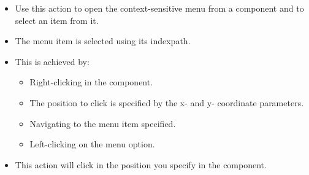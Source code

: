 
\begin{itemize}
\item Use this action to open the context-sensitive menu from a component and to select an item from it.
\item The menu item is selected using its indexpath. 
\item This is achieved by:
\begin{itemize}
\item Right-clicking in the component.
\item The position to click is specified by the x- and y- coordinate parameters.
\item Navigating to the menu item specified.
\item Left-clicking on the menu option.  
\end{itemize}
\item This action will click in the position you specify in the component.

\end{itemize}



